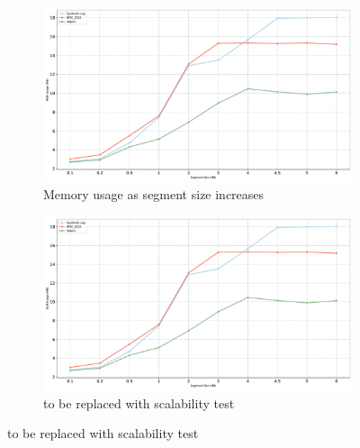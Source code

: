 \begin{figure}[ht]
\begin{subfigure}{0.49\textwidth}   
  \centering      
  \includegraphics[width=\textwidth]{content/figures/lineplot_segsize_combined.pdf}
  \caption{Memory usage as segment size increases}
  \label{snr_c}
\end{subfigure}\hfill
\begin{subfigure}{0.49\textwidth}   
  \centering
  \includegraphics[width=\textwidth]{content/figures/lineplot_segsize_combined.pdf}
  \caption{to be replaced with scalability test}
  \label{snr_d}
\end{subfigure}


\end{figure}
